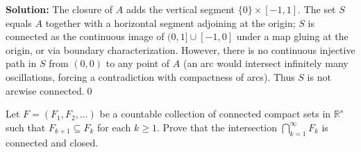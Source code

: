     

\bigskip\noindent\textbf{Solution:}
The closure of $A$ adds the vertical segment $\{0\}\times[-1,1]$. The set $S$ equals $A$ together with a horizontal segment adjoining at the origin; $S$ is connected as the continuous image of $(0,1]\cup[-1,0]$ under a map gluing at the origin, or via boundary characterization. However, there is no continuous injective path in $S$ from $(0,0)$ to any point of $A$ (an arc would intersect infinitely many oscillations, forcing a contradiction with compactness of arcs). Thus $S$ is not arcwise connected.\qed



\begin{problembox}
Let $F = (F_1, F_2, \ldots)$ be a countable collection of connected compact sets in $\mathbb{R}^s$ such that $F_{k+1} \subseteq F_k$ for each $k \geq 1$. Prove that the intersection $\bigcap_{k=1}^{\infty} F_k$ is connected and closed.
\end{problembox}

